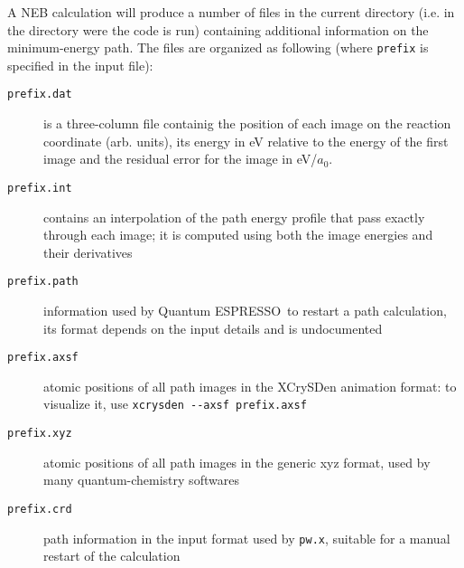 \documentclass[12pt,a4paper]{article}
\def\qe{{\sc Quantum ESPRESSO}}
\def\pw.x{\texttt{pw.x}}
\begin{document}
A NEB calculation will produce a number of files in the current directory
(i.e. in the directory were the code is run) containing additional information
on the minimum-energy path. The files are organized as following
(where \texttt{prefix} is specified in the input file):
\begin{description}
\item[\texttt{prefix.dat}]
is a three-column file containig the position of each image on the reaction
coordinate (arb. units), its energy in eV relative to the energy of the first image
and the residual error for the image in eV/$a_0$.
\item[\texttt{prefix.int}]
contains an interpolation of the path energy profile that pass exactly through each
image; it is computed using both the image energies and their derivatives
\item[\texttt{prefix.path}]
information used by \qe\ 
to restart a path calculation, its format depends on the input
details and is undocumented
\item[\texttt{prefix.axsf}]
atomic positions of all path images in the XCrySDen animation format:
to visualize it, use \texttt{xcrysden -\--axsf prefix.axsf}
\item[\texttt{prefix.xyz}]
atomic positions of all path images in the generic xyz format, used by
many quantum-chemistry softwares
\item[\texttt{prefix.crd}]
path information in the input format used by \pw.x, suitable for a manual
restart of the calculation
\end{description}
\end{document}
